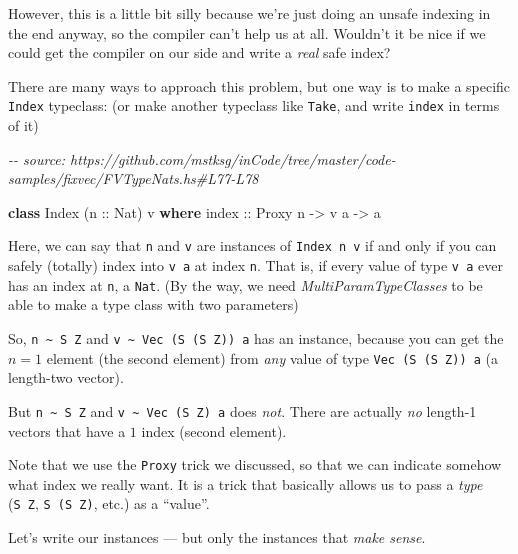 \documentclass[]{article}
\newenvironment{Shaded}{}{}
\newcommand{\CommentTok}[1]{\textcolor[rgb]{0.38,0.63,0.69}{\textit{#1}}}
\newcommand{\DataTypeTok}[1]{\textcolor[rgb]{0.56,0.13,0.00}{#1}}
\newcommand{\KeywordTok}[1]{\textcolor[rgb]{0.00,0.44,0.13}{\textbf{#1}}}
\newcommand{\NormalTok}[1]{#1}
\newcommand{\OtherTok}[1]{\textcolor[rgb]{0.00,0.44,0.13}{#1}}
\begin{document}
However, this is a little bit silly because we're just doing an unsafe indexing
in the end anyway, so the compiler can't help us at all. Wouldn't it be nice if
we could get the compiler on our side and write a \emph{real} safe index?

There are many ways to approach this problem, but one way is to make a specific
\texttt{Index} typeclass: (or make another typeclass like \texttt{Take}, and
write \texttt{index} in terms of it)

\begin{Shaded}
\begin{Highlighting}[]
\CommentTok{{-}{-} source: https://github.com/mstksg/inCode/tree/master/code{-}samples/fixvec/FVTypeNats.hs\#L77{-}L78}

\KeywordTok{class} \DataTypeTok{Index}\NormalTok{ (}\OtherTok{n ::} \DataTypeTok{Nat}\NormalTok{) v }\KeywordTok{where}
\OtherTok{    index ::} \DataTypeTok{Proxy}\NormalTok{ n }\OtherTok{{-}\textgreater{}}\NormalTok{ v a }\OtherTok{{-}\textgreater{}}\NormalTok{ a}
\end{Highlighting}
\end{Shaded}

Here, we can say that \texttt{n} and \texttt{v} are instances of
\texttt{Index\ n\ v} if and only if you can safely (totally) index into
\texttt{v\ a} at index \texttt{n}. That is, if every value of type \texttt{v\ a}
ever has an index at \texttt{n}, a \texttt{Nat}. (By the way, we need
\emph{MultiParamTypeClasses} to be able to make a type class with two
parameters)

So, \texttt{n\ \textasciitilde{}\ S\ Z} and
\texttt{v\ \textasciitilde{}\ Vec\ (S\ (S\ Z))\ a} has an instance, because you
can get the \(n = 1\) element (the second element) from \emph{any} value of type
\texttt{Vec\ (S\ (S\ Z))\ a} (a length-two vector).

But \texttt{n\ \textasciitilde{}\ S\ Z} and
\texttt{v\ \textasciitilde{}\ Vec\ (S\ Z)\ a} does \emph{not}. There are
actually \emph{no} length-1 vectors that have a \(1\) index (second element).

Note that we use the \texttt{Proxy} trick we discussed, so that we can indicate
somehow what index we really want. It is a trick that basically allows us to
pass a \emph{type} (\texttt{S\ Z}, \texttt{S\ (S\ Z)}, etc.) as a ``value''.

Let's write our instances --- but only the instances that \emph{make sense}.
\end{document}
